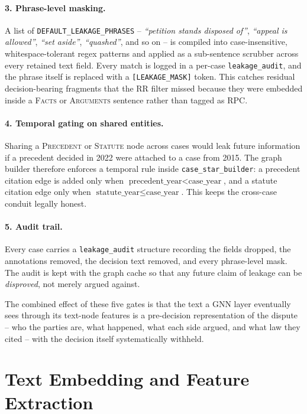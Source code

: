 \paragraph{3. Phrase-level masking.} A list of
\texttt{DEFAULT\_LEAKAGE\_PHRASES} --
\emph{``petition stands disposed of''},
\emph{``appeal is allowed''},
\emph{``set aside''},
\emph{``quashed''}, and so on -- is compiled into case-insensitive,
whitespace-tolerant regex patterns and applied as a sub-sentence
scrubber across every retained text field. Every match is logged in a
per-case \texttt{leakage\_audit}, and the phrase itself is replaced
with a \texttt{[LEAKAGE\_MASK]} token. This catches residual
decision-bearing fragments that the RR filter missed because they were
embedded inside a \textsc{Facts} or \textsc{Arguments} sentence rather
than tagged as \textsc{RPC}.

\paragraph{4. Temporal gating on shared entities.} Sharing a
\textsc{Precedent} or \textsc{Statute} node across cases would leak
future information if a precedent decided in 2022 were attached to a
case from 2015. The graph builder therefore enforces a temporal rule
inside \texttt{case\_star\_builder}: a precedent citation edge is added
only when $\text{precedent\_year} < \text{case\_year}$, and a statute
citation edge only when $\text{statute\_year} \leq \text{case\_year}$.
This keeps the cross-case conduit legally honest.

\paragraph{5. Audit trail.} Every case carries a \texttt{leakage\_audit}
structure recording the fields dropped, the annotations removed, the
decision text removed, and every phrase-level mask. The audit is kept
with the graph cache so that any future claim of leakage can be
\emph{disproved}, not merely argued against.

The combined effect of these five gates is that the text a GNN layer
eventually sees through its text-node features is a pre-decision
representation of the dispute -- who the parties are, what happened,
what each side argued, and what law they cited -- with the decision
itself systematically withheld.

\section{Text Embedding and Feature Extraction}
\label{sec:text_features}


